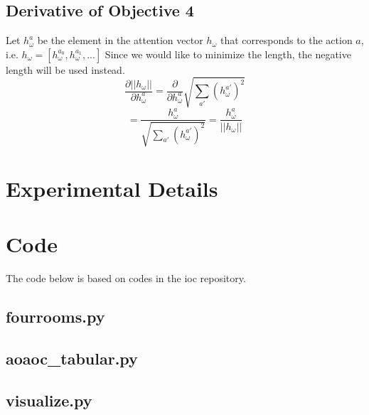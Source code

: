 \documentclass{article}
\begin{document}
	\subsection{Derivative of Objective 4}
	Let $h_\omega^a$ be the element in the attention vector $h_\omega$ that corresponds to the action $a$, i.e. $h_\omega = [h_\omega^{a_0}, h_\omega^{a_1}, ...]$
	Since we would like to minimize the length, the negative length will be used instead.
	$$\frac{\partial ||h_\omega||}{\partial h_\omega^a} = \frac{\partial}{\partial h_\omega^a} \sqrt{\sum_{a'} (h_\omega^{a'})^2}$$
	$$= \frac{h_\omega^a}{\sqrt{\sum_{a'} (h_\omega^{a'})^2}} = \frac{h_\omega^a}{||h_\omega||}$$
	\section{Experimental Details}
	\section{Code}
	The code below is based on codes in the ioc repository.\cite{iocrepo}
	\lstset{style=code}
	\subsection*{fourrooms.py}
	
	\subsection*{aoaoc\_tabular.py}
	
	\subsection*{visualize.py}
	
\end{document}
